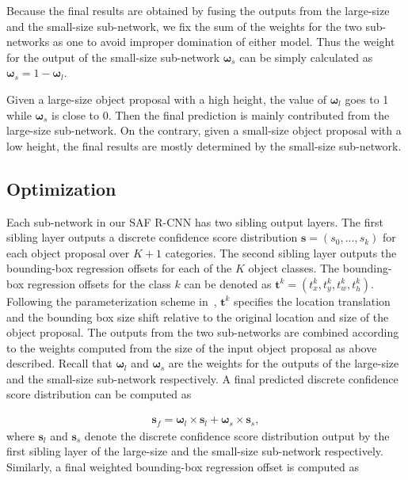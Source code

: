 \documentclass[journal]{IEEEtran}
\begin{document}
Because the final results are obtained by fusing the outputs from the large-size and the small-size sub-network, we fix the sum of the weights for the two sub-networks as one to avoid improper domination of either model. Thus the weight for the output of the small-size sub-network $\boldsymbol{\omega}_s$ can be simply calculated as $\boldsymbol{\omega}_s = 1 - \boldsymbol{\omega}_l$.

Given a large-size object proposal with a high height, the value of $\boldsymbol{\omega}_l$ goes to 1 while $\boldsymbol{\omega}_s$ is close to 0. Then the final prediction is mainly contributed from the large-size sub-network. On the contrary, given a small-size object proposal with a low height, the final results are mostly determined by the small-size sub-network.


\subsection{Optimization}
Each sub-network in our SAF R-CNN has two sibling output layers. The first sibling layer outputs a discrete confidence score distribution $\boldsymbol{s} = (s_0,...,s_k)$ for each object proposal over $K+1$ categories. The second sibling layer outputs the bounding-box regression offsets for each of the $K$ object classes. The bounding-box regression offsets for the class $k$ can be denoted as $\boldsymbol{t}^k = (t_x^k, t_y^k, t_w^k, t_h^k)$. Following the parameterization scheme in~\cite{girshick2014rich}, $\boldsymbol{t}^k$ specifies the location translation and the bounding box size shift relative to the original location and size of the object proposal. The outputs from the two sub-networks are combined according to the weights computed from the size of the input object proposal as above described. Recall that $\boldsymbol{\omega}_l$ and $\boldsymbol{\omega}_s$ are the weights for the outputs of the large-size and the small-size sub-network respectively. A final predicted discrete confidence score distribution can be computed as

\begin{equation}
	\begin{aligned}
		\boldsymbol{s}_f = \boldsymbol{\omega}_l \times \boldsymbol{s}_l + \boldsymbol{\omega}_s \times \boldsymbol{s}_s,
	\end{aligned}
\end{equation}
where $\boldsymbol{s}_l$ and $\boldsymbol{s}_s$ denote the discrete confidence score distribution output by the first sibling layer of the large-size and the small-size sub-network respectively. Similarly, a final weighted bounding-box regression offset is computed as
\end{document}
